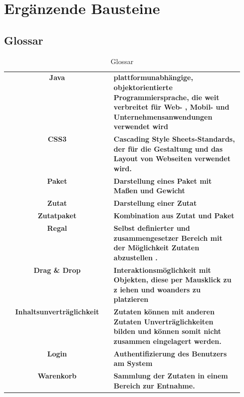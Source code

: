 %
%

\section{Ergänzende Bausteine}

\subsection{Glossar}

\begin{table}[h]
  \centering
  \begin{tabular}{|c|p{0.55\linewidth}|}
  \hline
    \textbf{Java} & \textbf{plattformunabhängige, objektorientierte Programmiersprache, die weit verbreitet für Web-
    , Mobil- und Unternehmensanwendungen verwendet wird} \\
    \textbf{CSS3} & \textbf{Cascading Style Sheets-Standards, der für die Gestaltung und das Layout von Webseiten verwendet wird.} \\
    \textbf{Paket} & \textbf{Darstellung eines Paket mit Maßen und Gewicht} \\
    \textbf{Zutat} & \textbf{Darstellung einer Zutat} \\
    \textbf{Zutatpaket} & \textbf{Kombination aus Zutat und Paket} \\
    \textbf{Regal} & \textbf{Selbst definierter und zusammengesetzer Bereich mit der Möglichkeit Zutaten abzustellen
  .} \\
    \textbf{Drag \& Drop} & \textbf{Interaktionsmöglichkeit mit Objekten, diese per Mausklick zu z iehen und
  woanders zu platzieren} \\
    \textbf{Inhaltsunverträglichkeit} & \textbf{Zutaten können mit anderen Zutaten Unverträglichkeiten bilden und
  können somit nicht zusammen eingelagert werden.} \\
    \textbf{Login} & \textbf{Authentifizierung des Benutzers am System} \\
    \textbf{Warenkorb} & \textbf{Sammlung der Zutaten in einem Bereich zur Entnahme.} \\

  \hline
  \end{tabular}
  \caption{Glossar}
\end{table}